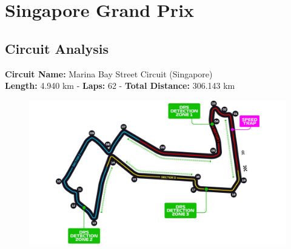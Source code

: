 \section{Singapore Grand Prix}

\subsection{Circuit Analysis}

\textbf{Circuit Name:} Marina Bay Street Circuit (Singapore) \\
\textbf{Length:} 4.940 km - \textbf{Laps:} 62 - \textbf{Total Distance:} 306.143 km

\begin{figure}[H]
    \centering
    \includegraphics[width=0.75\linewidth]{images/18.Singapore_Circuit.jpg}
\end{figure}

